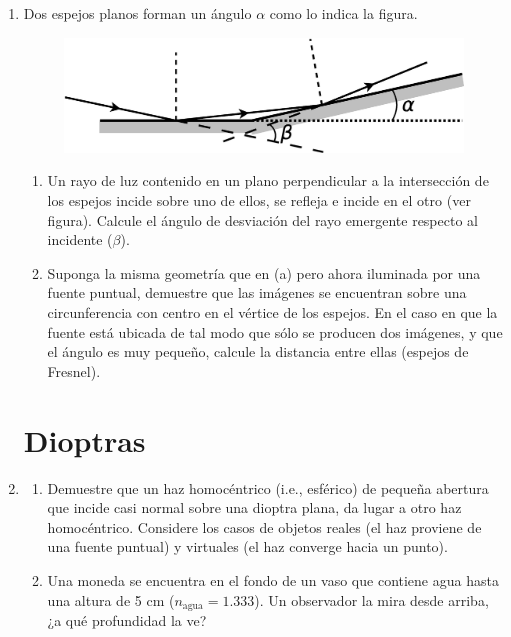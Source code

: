 \documentclass[11pt,spanish]{article}
\begin{document}
\begin{enumerate}
    
    \item Dos espejos planos forman un ángulo $\alpha$ como lo indica la figura.
    \begin{figure}[H]
        \centering{}\includegraphics[clip,scale=0.25]{figs/ej3-12}
    \end{figure}
    
    \begin{enumerate}
        \item Un rayo de luz contenido en un plano perpendicular a la
        intersección de los espejos incide sobre uno de ellos, se refleja e
        incide en el otro (ver figura). Calcule el ángulo de desviación del rayo
        emergente respecto al incidente ($\beta$).
    
        \item Suponga la misma geometría que en (a) pero ahora iluminada por una
        fuente puntual, demuestre que las imágenes se encuentran sobre una
        circunferencia con centro en el vértice de los espejos. En el caso
        en que la fuente está ubicada de tal modo que sólo se producen dos
        imágenes, y que el ángulo es muy pequeño, calcule la distancia entre
        ellas (espejos de Fresnel).
    \end{enumerate}
    
\section*{Dioptras}


    \item 
    \begin{enumerate}
        \item Demuestre que un haz homocéntrico (i.e., esférico) de pequeña
        abertura que incide casi normal sobre una dioptra plana, da lugar a otro
        haz homocéntrico. Considere los casos de objetos reales (el haz proviene
        de una fuente puntual) y virtuales (el haz converge hacia un punto).

        \item Una moneda se encuentra en el fondo de un vaso que contiene agua
        hasta una altura de 5 cm ($n_\text{agua}=1.333$). Un observador la mira
        desde arriba, ¿a qué profundidad la ve?


\end{enumerate}
\end{enumerate}
\end{document}
